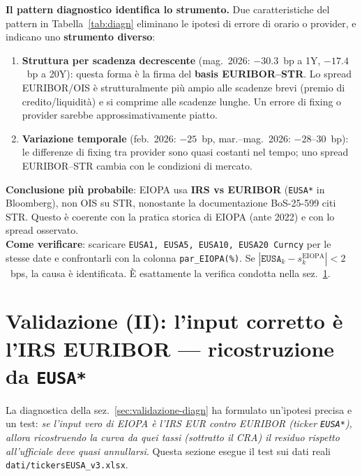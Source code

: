 \documentclass[11pt,a4paper]{article}
\theoremstyle{plain}
\theoremstyle{definition}
\theoremstyle{remark}
\begin{document}
\begin{warningbox}
\textbf{Il pattern diagnostico identifica lo strumento.}
Due caratteristiche del pattern in Tabella~\ref{tab:diagn} eliminano le ipotesi di
errore di orario o provider, e indicano uno \textbf{strumento diverso}:
\begin{enumerate}
  \item \textbf{Struttura per scadenza decrescente} (mag.~2026: $-30.3$~bp a 1Y,
        $-17.4$~bp a 20Y): questa forma \`e la firma del \textbf{basis
        EURIBOR--\texteuro{}STR}. Lo spread EURIBOR/OIS \`e strutturalmente pi\`u ampio
        alle scadenze brevi (premio di credito/liquidit\`a) e si comprime alle scadenze
        lunghe. Un errore di fixing o provider sarebbe approssimativamente piatto.
  \item \textbf{Variazione temporale} (feb.~2026: $-25$~bp, mar.--mag.~2026: $-28$--$30$~bp):
        le differenze di fixing tra provider sono quasi costanti nel tempo; uno spread
        EURIBOR--\texteuro{}STR cambia con le condizioni di mercato.
\end{enumerate}
\textbf{Conclusione pi\`u probabile}: EIOPA usa \textbf{IRS vs EURIBOR} (\texttt{EUSA*} in
Bloomberg), non OIS su \texteuro{}STR, nonostante la documentazione BoS-25-599 citi
\texteuro{}STR. Questo \`e coerente con la pratica storica di EIOPA (ante 2022) e con lo
spread osservato.\\[2pt]
\textbf{Come verificare}: scaricare \texttt{EUSA1, EUSA5, EUSA10, EUSA20 Curncy} per le
stesse date e confrontarli con la colonna \texttt{par\_EIOPA(\%)}. Se
$|\texttt{EUSA}_k - s_k^{\text{EIOPA}}| < 2$~bps, la causa \`e identificata. \`E
esattamente la verifica condotta nella sez.~\ref{sec:validazione-eusa}.
\end{warningbox}

\section{Validazione (II): l'input corretto \`e l'IRS EURIBOR --- ricostruzione da \texttt{EUSA*}}
\label{sec:validazione-eusa}

La diagnostica della sez.~\ref{sec:validazione-diagn} ha formulato un'ipotesi precisa e
un test: \emph{se l'input vero di EIOPA \`e l'IRS EUR contro EURIBOR (ticker \texttt{EUSA*}),
allora ricostruendo la curva da quei tassi (sottratto il CRA) il residuo rispetto
all'ufficiale deve quasi annullarsi}. Questa sezione esegue il test sui dati reali
\texttt{dati/tickersEUSA\_v3.xlsx}.
\end{document}
